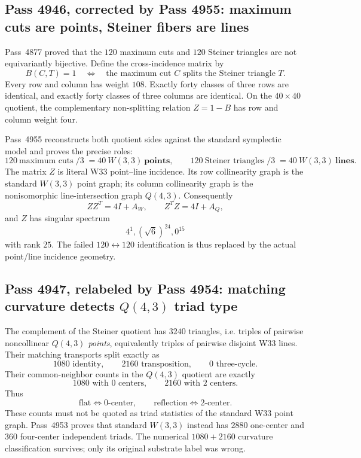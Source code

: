 \subsection{Pass 4946, corrected by Pass 4955: maximum cuts are points, Steiner fibers are lines}
Pass~4877 proved that the $120$ maximum cuts and $120$ Steiner triangles are
not equivariantly bijective.  Define the cross-incidence matrix by
\[
  B(C,T)=1
  \quad\Longleftrightarrow\quad
  \text{the maximum cut $C$ splits the Steiner triangle $T$}.
\]
Every row and column has weight $108$.  Exactly forty classes of three rows
are identical, and exactly forty classes of three columns are identical.  On
the $40\times40$ quotient, the complementary non-splitting relation
$Z=1-B$ has row and column weight four.

Pass~4955 reconstructs both quotient sides against the standard symplectic
model and proves the precise roles:
\[
  \boxed{
  120\ \text{maximum cuts}\;/3\;=40\ W(3,3)\ \textbf{points},
  \qquad
  120\ \text{Steiner triangles}\;/3\;=40\ W(3,3)\ \textbf{lines}.}
\]
The matrix $Z$ is literal W33 point--line incidence.  Its row collinearity
graph is the standard $W(3,3)$ point graph; its column collinearity graph is
the nonisomorphic line-intersection graph $Q(4,3)$.  Consequently
\[
 ZZ^{T}=4I+A_W,\qquad Z^{T}Z=4I+A_Q,
\]
and $Z$ has singular spectrum
\[
  \boxed{4^1,(\sqrt6)^{24},0^{15}}
\]
with rank $25$.  The failed $120\leftrightarrow120$ identification is thus
replaced by the actual point/line incidence geometry.

\subsection{Pass 4947, relabeled by Pass 4954: matching curvature detects $Q(4,3)$ triad type}
The complement of the Steiner quotient has $3240$ triangles, i.e. triples of
pairwise noncollinear \emph{$Q(4,3)$ points}, equivalently triples of pairwise
disjoint W33 lines.  Their matching transports split exactly as
\[
  1080\text{ identity},\qquad2160\text{ transposition},\qquad0\text{ three-cycle}.
\]
Their common-neighbor counts in the $Q(4,3)$ quotient are exactly
\[
  1080\text{ with }0\text{ centers},\qquad
  2160\text{ with }2\text{ centers}.
\]
Thus
\[
  \boxed{\text{flat}\iff0\text{-center},\qquad
         \text{reflection}\iff2\text{-center}.}
\]
These counts must not be quoted as triad statistics of the standard W33 point
graph.  Pass~4953 proves that standard $W(3,3)$ instead has
$2880$ one-center and $360$ four-center independent triads.  The numerical
$1080+2160$ curvature classification survives; only its original substrate
label was wrong.

